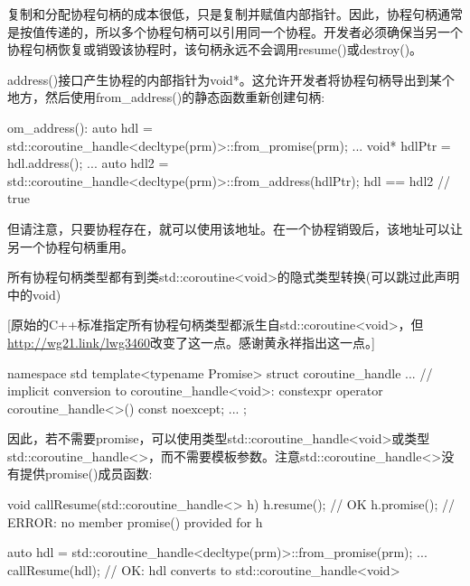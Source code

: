 复制和分配协程句柄的成本很低，只是复制并赋值内部指针。因此，协程句柄通常是按值传递的，所以多个协程句柄可以引用同一个协程。开发者必须确保当另一个协程句柄恢复或销毁该协程时，该句柄永远不会调用resume()或destroy()。

address()接口产生协程的内部指针为void*。这允许开发者将协程句柄导出到某个地方，然后使用from\_address()的静态函数重新创建句柄:

\begin{cpp}
om_address():
auto hdl = std::coroutine_handle<decltype(prm)>::from_promise(prm);
...
void* hdlPtr = hdl.address();
...
auto hdl2 = std::coroutine_handle<decltype(prm)>::from_address(hdlPtr);
hdl == hdl2 // true
\end{cpp}

但请注意，只要协程存在，就可以使用该地址。在一个协程销毁后，该地址可以让另一个协程句柄重用。


所有协程句柄类型都有到类std::coroutine<void>的隐式类型转换(可以跳过此声明中的void)

[原始的C++标准指定所有协程句柄类型都派生自std::coroutine<void>，但\url{http://wg21.link/lwg3460}改变了这一点。感谢黄永祥指出这一点。]

\begin{cpp}
namespace std {
	template<typename Promise>
	struct coroutine_handle {
		...
		// implicit conversion to coroutine_handle<void>:
		constexpr operator coroutine_handle<>() const noexcept;
		...
	};
}
\end{cpp}

因此，若不需要promise，可以使用类型std::coroutine\_handle<void>或类型std::coroutine\_handle<>，而不需要模板参数。注意std::coroutine\_handle<>没有提供promise()成员函数:

\begin{cpp}
void callResume(std::coroutine_handle<> h)
{
	h.resume(); // OK
	h.promise(); // ERROR: no member promise() provided for h
}

auto hdl = std::coroutine_handle<decltype(prm)>::from_promise(prm);
...
callResume(hdl); // OK: hdl converts to std::coroutine_handle<void>
\end{cpp}








